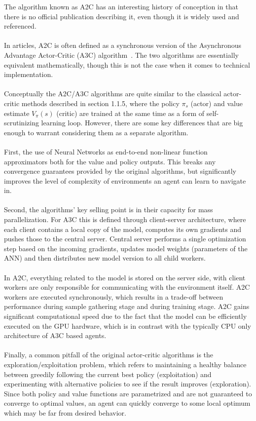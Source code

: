 The algorithm known as A2C has an interesting history of conception in that there is no official publication describing it, even though it is widely used and referenced.
\\\\
In articles, A2C is often defined as a synchronous version of the Asynchronous Advantage Actor-Critic (A3C) algorithm~\cite{mnih16}. The two algorithms are essentially equivalent mathematically, though this is not the case when it comes to technical implementation.
\\\\
Conceptually the A2C/A3C algorithms are quite similar to the classical actor-critic methods described in section 1.1.5, where the policy $\pi_s$ (actor) and value estimate $V_\pi(s)$ (critic) are trained at the same time as a form of self-scrutinizing learning loop. However, there are some key differences that are big enough to warrant considering them as a separate algorithm.
\\\\
First, the use of Neural Networks as end-to-end non-linear function approximators both for the value and policy outputs. This breaks any convergence guarantees provided by the original algorithms, but significantly improves the level of complexity of environments an agent can learn to navigate in.
\\\\
Second, the algorithms' key selling point is in their capacity for mass parallelization. For A3C this is defined through client-server architecture, where each client contains a local copy of the model, computes its own gradients and pushes those to the central server. Central server performs a single optimization step based on the incoming gradients, updates model weights (parameters of the ANN) and then distributes new model version to all child workers. 
\\\\
In A2C, everything related to the model is stored on the server side, with client workers are only responsible for communicating with the environment itself. A2C workers are executed synchronously, which results in a trade-off between performance during sample gathering stage and during training stage. A2C gains significant computational speed due to the fact that the model can be efficiently executed on the GPU hardware, which is in contrast with the typically CPU only architecture of A3C based agents.
\\\\
Finally, a common pitfall of the original actor-critic algorithms is the exploration/exploitation problem, which refers to maintaining a healthy balance between greedily following the current best policy (exploitation) and experimenting with alternative policies to see if the result improves (exploration). Since both policy and value functions are parametrized and are not guaranteed to converge to optimal values, an agent can quickly converge to some local optimum which may be far from desired behavior. 
